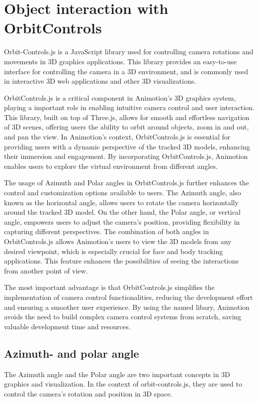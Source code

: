 \section{Object interaction with OrbitControls}
\author{Romeo Bhuiyan}
Orbit-Controls.js is a JavaScript library used for controlling camera rotations 
and movements in 3D graphics applications. This library provides an easy-to-use 
interface for controlling the camera in a 3D environment, and is commonly used in 
interactive 3D web applications and other 3D visualizations.

OrbitControls.js is a critical component in Animotion's 3D graphics system, playing a important role in 
enabling intuitive camera control and user interaction. This library, built on top of Three.js, allows 
for smooth and effortless navigation of 3D scenes, offering users the ability to orbit around objects, zoom in and out, and pan the view.
In Animotion's context, OrbitControls.js is essential for providing users with a dynamic perspective of the tracked 3D models, 
enhancing their immersion and engagement. By incorporating OrbitControls.js, 
Animotion enables users to explore the virtual environment from different angles.

The usage of Azimuth and Polar angles in OrbitControls.js further enhances the control and customization options available to users.
The Azimuth angle, also known as the horizontal angle, allows users to rotate the camera horizontally around the tracked 3D 
model. On the other hand, the Polar angle, or vertical angle, empowers users to adjust the camera's position, 
providing flexibility in capturing different perspectives.
The combination of both angles in OrbitControls.js allows Animotion's users to view the 3D models from any desired viewpoint, 
which is especially crucial for face and body tracking applications. This feature enhances the possibilities of seeing the 
interactions from another point of view.

The most important advantage is that OrbitControls.js simplifies the implementation of camera control functionalities, 
reducing the development effort and ensuring a smoother user experience. By using the named libary, 
Animotion avoids the need to build complex camera control systems from scratch, saving valuable development time and resources.
\cite{orbitcontrols}

\subsection{Azimuth- and polar angle}
The Azimuth angle and the Polar angle are two important concepts in 3D graphics and visualization. 
In the context of orbit-controls.js, they are used to control the camera's rotation and position in 3D space.

